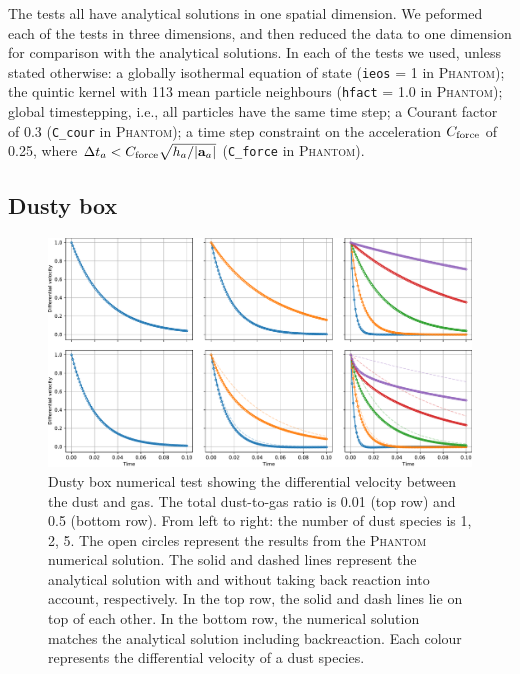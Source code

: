 \documentclass[fleqn,usenatbib]{mnras}
\let\vec\mathbf
\begin{document}
The tests all have analytical solutions in one spatial dimension. We peformed
each of the tests in three dimensions, and then reduced the data to one
dimension for comparison with the analytical solutions. In each of the tests we
used, unless stated otherwise: a globally isothermal equation of state
(\texttt{ieos} = 1 in \textsc{Phantom}); the quintic kernel with 113 mean
particle neighbours (\texttt{hfact} = 1.0 in \textsc{Phantom}); global
timestepping, i.e., all particles have the same time step; a Courant factor of
0.3 (\texttt{C\_cour} in \textsc{Phantom}); a time step constraint on the
acceleration \( C_{\rm force} \) of 0.25, where \(\Delta t_a < C_{\rm force}
\sqrt{h_a / |\vec{a}_a|} \) (\texttt{C\_force} in \textsc{Phantom}).


\subsection{Dusty box}%
\label{subsec:box}

\begin{figure}
   \begin{center}
      \includegraphics[width=\textwidth]{figs/dustybox_differential_velocity_comparison.pdf}
      \caption{Dusty box numerical test showing the differential velocity
         between the dust and gas. The total dust-to-gas ratio is 0.01 (top row)
         and 0.5 (bottom row). From left to right: the number of dust species is
         1, 2, 5. The open circles represent the results from the
         \textsc{Phantom} numerical solution. The solid and dashed lines
         represent the analytical solution with and without taking back reaction
         into account, respectively. In the top row, the solid and dash lines
         lie on top of each other. In the bottom row, the numerical solution
         matches the analytical solution including backreaction. Each colour
         represents the differential velocity of a dust species.%
         \label{fig:dustybox}}
   \end{center}
\end{figure}
\end{document}
